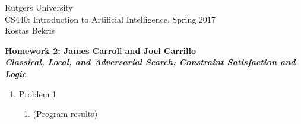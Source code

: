 \documentclass[11pt]{article}
\begin{document}
\sloppy

\noindent Rutgers University\\
CS440: Introduction to Artificial Intelligence, Spring 2017\\
Kostas Bekris\\

\begin{center}
\LARGE{\textbf{Homework 2: James Carroll and Joel Carrillo}}\\
\large{\textbf{\emph{Classical, Local, and Adversarial Search; Constraint Satisfaction and Logic}}}
\end{center}

\vspace{.1in}

\begin{enumerate}

\item Problem 1
\begin{enumerate}
\item (Program results)
\end{enumerate}


\end{enumerate}
\end{document}
